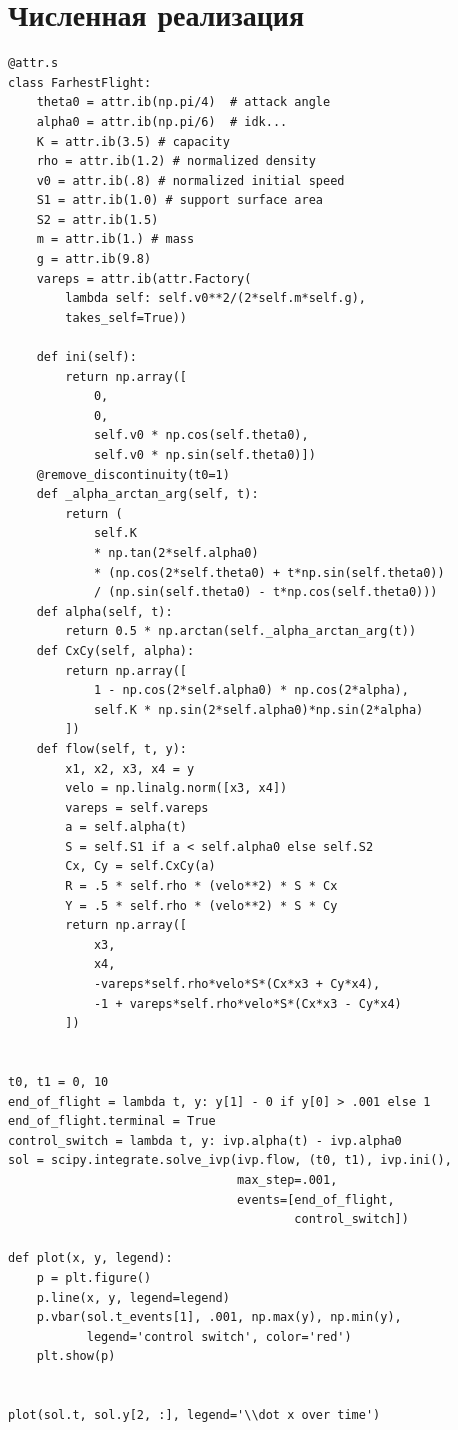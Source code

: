 \documentclass{article}
\begin{document}
\section{Численная реализация}

\begin{verbatim}
@attr.s
class FarhestFlight:
    theta0 = attr.ib(np.pi/4)  # attack angle
    alpha0 = attr.ib(np.pi/6)  # idk...
    K = attr.ib(3.5) # capacity
    rho = attr.ib(1.2) # normalized density
    v0 = attr.ib(.8) # normalized initial speed
    S1 = attr.ib(1.0) # support surface area
    S2 = attr.ib(1.5)
    m = attr.ib(1.) # mass
    g = attr.ib(9.8)
    vareps = attr.ib(attr.Factory(
        lambda self: self.v0**2/(2*self.m*self.g),
        takes_self=True))
    
    def ini(self):
        return np.array([
            0,
            0,
            self.v0 * np.cos(self.theta0),
            self.v0 * np.sin(self.theta0)])
    @remove_discontinuity(t0=1)
    def _alpha_arctan_arg(self, t):
        return (
            self.K
            * np.tan(2*self.alpha0)
            * (np.cos(2*self.theta0) + t*np.sin(self.theta0))
            / (np.sin(self.theta0) - t*np.cos(self.theta0)))
    def alpha(self, t):
        return 0.5 * np.arctan(self._alpha_arctan_arg(t))
    def CxCy(self, alpha):
        return np.array([
            1 - np.cos(2*self.alpha0) * np.cos(2*alpha),
            self.K * np.sin(2*self.alpha0)*np.sin(2*alpha)
        ])
    def flow(self, t, y):
        x1, x2, x3, x4 = y
        velo = np.linalg.norm([x3, x4])
        vareps = self.vareps
        a = self.alpha(t)
        S = self.S1 if a < self.alpha0 else self.S2
        Cx, Cy = self.CxCy(a)
        R = .5 * self.rho * (velo**2) * S * Cx
        Y = .5 * self.rho * (velo**2) * S * Cy
        return np.array([
            x3,
            x4,
            -vareps*self.rho*velo*S*(Cx*x3 + Cy*x4),
            -1 + vareps*self.rho*velo*S*(Cx*x3 - Cy*x4)
        ])


t0, t1 = 0, 10
end_of_flight = lambda t, y: y[1] - 0 if y[0] > .001 else 1
end_of_flight.terminal = True
control_switch = lambda t, y: ivp.alpha(t) - ivp.alpha0
sol = scipy.integrate.solve_ivp(ivp.flow, (t0, t1), ivp.ini(),
                                max_step=.001,
                                events=[end_of_flight,
                                        control_switch])
                                      
def plot(x, y, legend):
    p = plt.figure()
    p.line(x, y, legend=legend)
    p.vbar(sol.t_events[1], .001, np.max(y), np.min(y),
           legend='control switch', color='red')
    plt.show(p)


plot(sol.t, sol.y[2, :], legend='\\dot x over time')
\end{verbatim}
\end{document}

